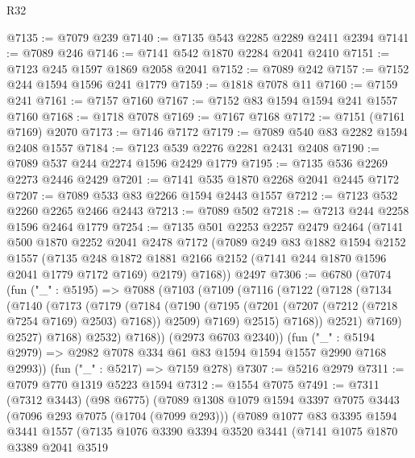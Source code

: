 \begin{lexlean}{R32}
\begin{coremodule}
@7135 := @7079 @239
@7140 := @7135 @543 @2285 @2289 @2411 @2394
@7141 := @7089 @246
@7146 := @7141 @542 @1870 @2284 @2041 @2410
@7151 := @7123 @245 @1597 @1869 @2058 @2041
@7152 := @7089 @242
@7157 := @7152 @244 @1594 @1596 @241 @1779
@7159 := @1818 @7078 @11
@7160 := @7159 @241
@7161 := @7157 @7160
@7167 := @7152 @83 @1594 @1594 @241 @1557 @7160
@7168 := @1718 @7078
@7169 := @7167 @7168
@7172 := @7151 (@7161 @7169) @2070
@7173 := @7146 @7172
@7179 := @7089 @540 @83 @2282 @1594 @2408 @1557
@7184 := @7123 @539 @2276 @2281 @2431 @2408
@7190 := @7089 @537 @244 @2274 @1596 @2429 @1779
@7195 := @7135 @536 @2269 @2273 @2446 @2429
@7201 := @7141 @535 @1870 @2268 @2041 @2445 @7172
@7207 := @7089 @533 @83 @2266 @1594 @2443 @1557
@7212 := @7123 @532 @2260 @2265 @2466 @2443
@7213 := @7089 @502
@7218 := @7213 @244 @2258 @1596 @2464 @1779
@7254 := @7135
    @501
    @2253
    @2257
    @2479
    @2464
    (@7141
      @500
      @1870
      @2252
      @2041
      @2478
      @7172
      (@7089
        @249
        @83
        @1882
        @1594
        @2152
        @1557
        (@7135 @248 @1872 @1881 @2166 @2152 (@7141 @244 @1870 @1596 @2041 @1779 @7172 @7169) @2179)
        @7168))
    @2497
@7306 := @6780
    (@7074
      (fun ("_" : @5195) =>
      @7088
        (@7103
          (@7109
            (@7116
              (@7122
                (@7128
                  (@7134
                    (@7140
                      (@7173
                        (@7179
                          (@7184
                            (@7190
                              (@7195 (@7201 (@7207 (@7212 (@7218 @7254 @7169) @2503) @7168)) @2509)
                              @7169)
                            @2515)
                          @7168))
                      @2521)
                    @7169)
                  @2527)
                @7168)
              @2532)
            @7168))
        (@2973 @6703 @2340))
      (fun ("_" : @5194 @2979) => @2982 @7078 @334 @61 @83 @1594 @1594 @1557 @2990 @7168 @2993))
    (fun ("_" : @5217) => @7159 @278)
@7307 := @5216 @2979
@7311 := @7079 @770 @1319 @5223 @1594
@7312 := @1554 @7075
@7491 := @7311
    (@7312 @3443)
    (@98 @6775)
    (@7089
      @1308
      @1079
      @1594
      @3397
      @7075
      @3443
      (@7096 @293 @7075 (@1704 (@7099 @293)))
      (@7089
        @1077
        @83
        @3395
        @1594
        @3441
        @1557
        (@7135
          @1076
          @3390
          @3394
          @3520
          @3441
          (@7141
            @1075
            @1870
            @3389
            @2041
            @3519

\end{coremodule}
\end{lexlean}
